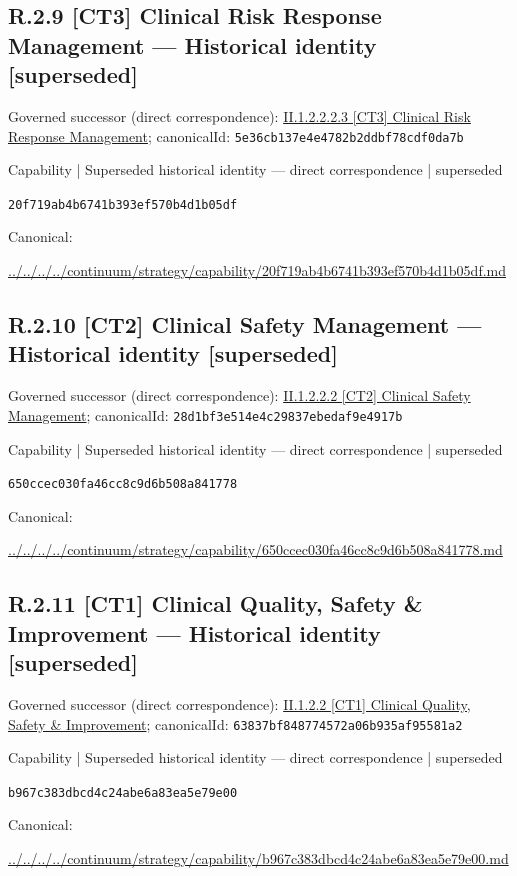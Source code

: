 \documentclass[10pt,a4paper]{article}
\begin{document}
\subsection*{R.2.9 [CT3] Clinical Risk Response Management — Historical identity [superseded]}
Governed successor (direct correspondence): \hyperref[element-5e36cb137e4e4782b2ddbf78cdf0da7b]{II.1.2.2.2.3 [CT3] Clinical Risk Response Management}; canonicalId: \texttt{5e36cb137e4e4782b2ddbf78cdf0da7b}\par
\label{element-20f719ab4b6741b393ef570b4d1b05df}
{\small Capability | Superseded historical identity — direct correspondence | superseded}\par
\texttt{20f719ab4b6741b393ef570b4d1b05df}\par
Canonical: \par
{\footnotesize\url{../../../../continuum/strategy/capability/20f719ab4b6741b393ef570b4d1b05df.md}}\par
\subsection*{R.2.10 [CT2] Clinical Safety Management — Historical identity [superseded]}
Governed successor (direct correspondence): \hyperref[element-28d1bf3e514e4c29837ebedaf9e4917b]{II.1.2.2.2 [CT2] Clinical Safety Management}; canonicalId: \texttt{28d1bf3e514e4c29837ebedaf9e4917b}\par
\label{element-650ccec030fa46cc8c9d6b508a841778}
{\small Capability | Superseded historical identity — direct correspondence | superseded}\par
\texttt{650ccec030fa46cc8c9d6b508a841778}\par
Canonical: \par
{\footnotesize\url{../../../../continuum/strategy/capability/650ccec030fa46cc8c9d6b508a841778.md}}\par
\subsection*{R.2.11 [CT1] Clinical Quality, Safety \& Improvement — Historical identity [superseded]}
Governed successor (direct correspondence): \hyperref[element-63837bf848774572a06b935af95581a2]{II.1.2.2 [CT1] Clinical Quality, Safety \& Improvement}; canonicalId: \texttt{63837bf848774572a06b935af95581a2}\par
\label{element-b967c383dbcd4c24abe6a83ea5e79e00}
{\small Capability | Superseded historical identity — direct correspondence | superseded}\par
\texttt{b967c383dbcd4c24abe6a83ea5e79e00}\par
Canonical: \par
{\footnotesize\url{../../../../continuum/strategy/capability/b967c383dbcd4c24abe6a83ea5e79e00.md}}\par
\end{document}
